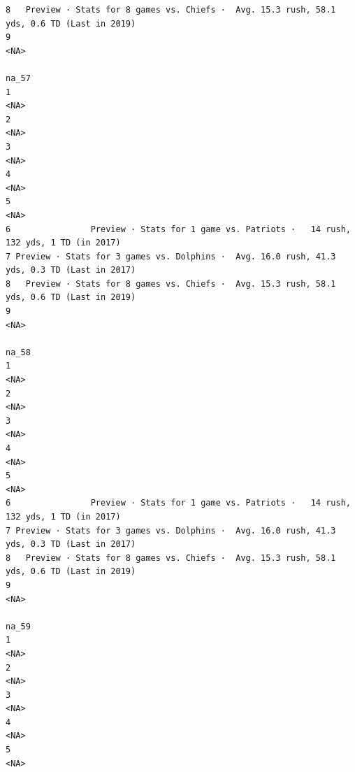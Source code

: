 \documentclass[
]{article}
\begin{document}
\begin{verbatim}
8   Preview · Stats for 8 games vs. Chiefs ·  Avg. 15.3 rush, 58.1 yds, 0.6 TD (Last in 2019)
9                                                                                        <NA>
                                                                                        na_57
1                                                                                        <NA>
2                                                                                        <NA>
3                                                                                        <NA>
4                                                                                        <NA>
5                                                                                        <NA>
6                Preview · Stats for 1 game vs. Patriots ·   14 rush, 132 yds, 1 TD (in 2017)
7 Preview · Stats for 3 games vs. Dolphins ·  Avg. 16.0 rush, 41.3 yds, 0.3 TD (Last in 2017)
8   Preview · Stats for 8 games vs. Chiefs ·  Avg. 15.3 rush, 58.1 yds, 0.6 TD (Last in 2019)
9                                                                                        <NA>
                                                                                        na_58
1                                                                                        <NA>
2                                                                                        <NA>
3                                                                                        <NA>
4                                                                                        <NA>
5                                                                                        <NA>
6                Preview · Stats for 1 game vs. Patriots ·   14 rush, 132 yds, 1 TD (in 2017)
7 Preview · Stats for 3 games vs. Dolphins ·  Avg. 16.0 rush, 41.3 yds, 0.3 TD (Last in 2017)
8   Preview · Stats for 8 games vs. Chiefs ·  Avg. 15.3 rush, 58.1 yds, 0.6 TD (Last in 2019)
9                                                                                        <NA>
                                                                                        na_59
1                                                                                        <NA>
2                                                                                        <NA>
3                                                                                        <NA>
4                                                                                        <NA>
5                                                                                        <NA>

\end{verbatim}
\end{document}
